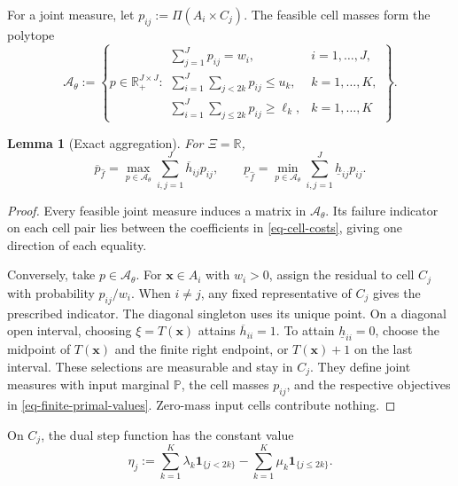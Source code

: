 \documentclass[review,11pt,3p,authoryear,nopreprintline]{elsarticle}
\newtheorem{lemma}{Lemma}
\begin{document}
For a joint measure, let $p_{ij}:=\Pi(A_i\times C_j)$. The feasible cell masses form the polytope
\begin{equation}
  \mathcal A_\theta:=
  \left\{p\in\mathbb R_+^{J\times J}:
  \begin{array}{ll}
    \displaystyle\sum_{j=1}^Jp_{ij}=w_i,&i=1,\ldots,J,\\[1mm]
    \displaystyle\sum_{i=1}^J\sum_{j<2k}p_{ij}\le u_k,&k=1,\ldots,K,\\[1mm]
    \displaystyle\sum_{i=1}^J\sum_{j\le2k}p_{ij}\ge\ell_k,&k=1,\ldots,K
  \end{array}\right\}.
  \label{eq-cell-mass-polytope}
\end{equation}

\begin{lemma}[Exact aggregation]
  \label{lem-exact-aggregation}
  For $\Xi=\mathbb R$,
  \begin{equation}
    \overline p_{\hat f}=\max_{p\in\mathcal A_\theta}\sum_{i,j=1}^J\overline h_{ij}p_{ij},
    \qquad
    \underline p_{\hat f}=\min_{p\in\mathcal A_\theta}\sum_{i,j=1}^J\underline h_{ij}p_{ij}.
    \label{eq-finite-primal-values}
  \end{equation}
\end{lemma}
\begin{proof}
  Every feasible joint measure induces a matrix in $\mathcal A_\theta$. Its failure indicator on each cell pair lies between the coefficients in \eqref{eq-cell-costs}, giving one direction of each equality.

  Conversely, take $p\in\mathcal A_\theta$. For $\bm x\in A_i$ with $w_i>0$, assign the residual to cell $C_j$ with probability $p_{ij}/w_i$. When $i\ne j$, any fixed representative of $C_j$ gives the prescribed indicator. The diagonal singleton uses its unique point. On a diagonal open interval, choosing $\xi=T(\bm x)$ attains $\overline h_{ii}=1$. To attain $\underline h_{ii}=0$, choose the midpoint of $T(\bm x)$ and the finite right endpoint, or $T(\bm x)+1$ on the last interval. These selections are measurable and stay in $C_j$. They define joint measures with input marginal $\mathbb P$, the cell masses $p_{ij}$, and the respective objectives in \eqref{eq-finite-primal-values}. Zero-mass input cells contribute nothing.
\end{proof}

On $C_j$, the dual step function has the constant value
\begin{equation}
  \eta_j:=
  \sum_{k=1}^K\lambda_k\mathbf1_{\{j<2k\}}
  -\sum_{k=1}^K\mu_k\mathbf1_{\{j\le2k\}}.
  \label{eq-dual-cell-values}
\end{equation}
\end{document}
